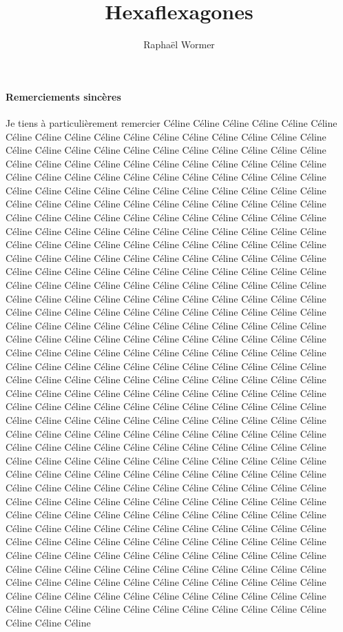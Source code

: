 \documentclass[10pt,a4paper]{article}
\author{Raphaël Wormer}
\title{Hexaflexagones}
\begin{document}
\maketitle
\tableofcontents

\paragraph{Remerciements sincères}
Je tiens à particulièrement remercier Céline Céline Céline Céline Céline Céline Céline Céline Céline Céline Céline Céline Céline Céline Céline Céline Céline Céline Céline Céline Céline Céline Céline Céline Céline Céline Céline Céline Céline Céline Céline Céline Céline Céline Céline Céline Céline Céline Céline Céline Céline Céline Céline Céline Céline Céline Céline Céline Céline Céline Céline Céline Céline Céline Céline Céline Céline Céline Céline Céline Céline Céline Céline Céline Céline Céline Céline Céline Céline Céline Céline Céline Céline Céline Céline Céline Céline Céline Céline Céline Céline Céline Céline Céline Céline Céline Céline Céline Céline Céline Céline Céline Céline Céline Céline Céline Céline Céline Céline Céline Céline Céline Céline Céline Céline Céline Céline Céline Céline Céline Céline Céline Céline Céline Céline Céline Céline Céline Céline Céline Céline Céline Céline Céline Céline Céline Céline Céline Céline Céline Céline Céline Céline Céline Céline Céline Céline Céline Céline Céline Céline Céline Céline Céline Céline Céline Céline Céline Céline Céline Céline Céline Céline Céline Céline Céline Céline Céline Céline Céline Céline Céline Céline Céline Céline Céline Céline Céline Céline Céline Céline Céline Céline Céline Céline Céline Céline Céline Céline Céline Céline Céline Céline Céline Céline Céline Céline Céline Céline Céline Céline Céline Céline Céline Céline Céline Céline Céline Céline Céline Céline Céline Céline Céline Céline Céline Céline Céline Céline Céline Céline Céline Céline Céline Céline Céline Céline Céline Céline Céline Céline Céline Céline Céline Céline Céline Céline Céline Céline Céline Céline Céline Céline Céline Céline Céline Céline Céline Céline Céline Céline Céline Céline Céline Céline Céline Céline Céline Céline Céline Céline Céline Céline Céline Céline Céline Céline Céline Céline Céline Céline Céline Céline Céline Céline Céline Céline Céline Céline Céline Céline Céline Céline Céline Céline Céline Céline Céline Céline Céline Céline Céline Céline Céline Céline Céline Céline Céline Céline Céline Céline Céline Céline Céline Céline Céline Céline Céline Céline Céline Céline Céline Céline Céline Céline Céline Céline Céline Céline Céline Céline Céline Céline Céline Céline Céline Céline Céline Céline Céline Céline Céline Céline Céline Céline Céline Céline Céline Céline Céline Céline Céline Céline Céline Céline Céline Céline Céline Céline Céline Céline Céline Céline Céline Céline Céline Céline Céline Céline Céline Céline Céline Céline Céline Céline Céline Céline Céline Céline Céline Céline Céline Céline Céline Céline Céline Céline Céline Céline Céline Céline Céline Céline Céline Céline Céline Céline Céline Céline Céline Céline Céline Céline Céline Céline Céline Céline Céline Céline Céline Céline Céline Céline Céline Céline Céline Céline Céline Céline Céline Céline Céline Céline Céline Céline 
\end{document}
